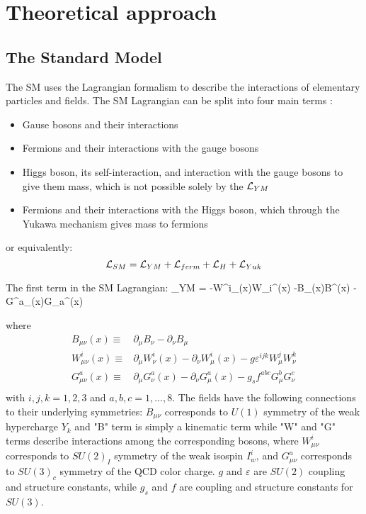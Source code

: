 
\chapter{Theoretical approach}
\label{ch:theory}

\section{The Standard Model}
The SM uses the Lagrangian formalism to describe the interactions of elementary particles and fields. The SM Lagrangian can be split into four main terms \cite{Mozer:2016wzi}:

\begin{itemize}
\item Gause bosons and their interactions
\item Fermions and their interactions with the gauge bosons
\item Higgs boson, its self-interaction, and interaction with the gauge bosons to give them mass, which is not possible solely by the $\mathcal{L}_{YM}$
\item Fermions and their interactions with the Higgs boson, which through the Yukawa mechanism gives mass to fermions
\end{itemize}
 
or equivalently:
\begin{equation}\label{lagr_SM}
\mathcal{L}_{SM} = \mathcal{L}_{YM} + \mathcal{L}_{ferm} + \mathcal{L}_{H} + \mathcal{L}_{Yuk} 
\end{equation}

The first term in the SM Lagrangian:
\beqn\label{lagr_YM}
\Lagr_{YM} = 	-W^i_{\mu\nu}(x)W_i^{\mu\nu}(x) -B_{\mu\nu}(x)B^{\mu\nu}(x) -G^a_{\mu\nu}(x)G_a^{\mu\nu}(x)
\eeqn

where
\begin{align}
B_{\mu\nu}(x)   \equiv & \partial_\mu B_\nu -  \partial_\nu B_\mu \label{B_tensor} \\ 
W^i_{\mu\nu}(x) \equiv & \partial_\mu W^i_\nu(x) - \partial_\nu W^i_\mu(x) - g\varepsilon^{ijk}W^j_\mu W^k_\nu \label{W_tensor}\\
G^a_{\mu\nu}(x) \equiv & \partial_\mu G^a_\nu(x) - \partial_\nu G^a_\mu(x) - g_s f^{abc}G^b_\mu G^c_\nu \label{G_tensor}\\
\end{align}
with $i,j,k = 1,2,3$ and $a,b,c = 1, ..., 8$. The fields have the following connections to their underlying symmetries: $B_{\mu\nu}$ corresponds to $U(1)$ symmetry of the weak hypercharge $Y_k$ and "B" term is simply a kinematic term while "W" and "G" terms describe interactions among the corresponding bosons, where $W^i_{\mu\nu}$ corresponds to $SU(2)_I$ symmetry of the weak isospin $I^i_{w}$, and $G^a_{\mu\nu}$ corresponds to $SU(3)_c$ symmetry of the QCD color charge. $g$ and $\varepsilon$ are $SU(2)$ coupling and structure constants, while $g_s$ and $f$ are coupling and structure constants for $SU(3)$.

